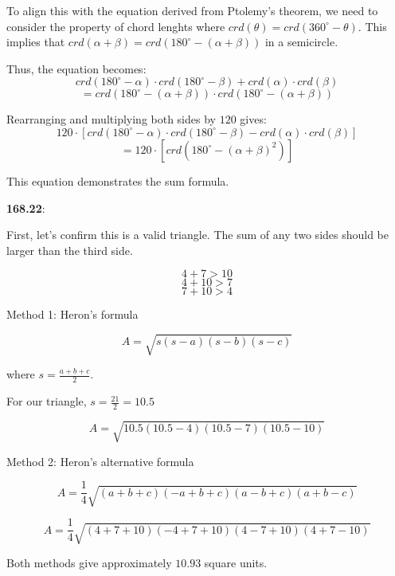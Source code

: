 \documentclass{article}
\begin{document}
To align this with the equation derived from Ptolemy's theorem, we need
to consider the property of chord lenghts where $crd(\theta) = crd(360^\circ - \theta)$.
This implies that $crd(\alpha + \beta) = crd(180^\circ - (\alpha + \beta))$ in a semicircle.

Thus, the equation becomes:
\[crd(180^\circ - \alpha) \cdot crd(180^\circ - \beta) + crd(\alpha) \cdot crd(\beta)\]
\[= crd(180^\circ - (\alpha + \beta)) \cdot crd(180^\circ - (\alpha + \beta))\]

Rearranging and multiplying both sides by $120$ gives:
\[120 \cdot [crd(180^\circ - \alpha) \cdot crd(180^\circ - \beta) - crd(\alpha) \cdot crd(\beta)]\]
\[= 120 \cdot [crd(180^\circ - (\alpha + \beta)^2)]\]

This equation demonstrates the sum formula.

\textbf{168.22}:

First, let's confirm this is a valid triangle.
The sum of any two sides should be larger than the third side.

\[4 + 7 > 10\]
\[4 + 10 > 7\]
\[7 + 10 > 4\]

Method 1: Heron's formula

\[A = \sqrt{s(s-a)(s-b)(s-c)}\]

where $s = \frac{a+b+c}{2}$.

For our triangle,
$s = \frac{21}{2} = 10.5$

\[A = \sqrt{10.5(10.5 - 4)(10.5 - 7)(10.5 - 10)}\]

Method 2: Heron's alternative formula

\[A = \frac{1}{4} \sqrt{(a+b+c)(-a + b + c)(a - b + c)(a + b - c)}\]

\[A = \frac{1}{4} \sqrt{(4+7+10)(-4+7+10)(4-7+10)(4+7-10)}\]

Both methods give approximately $10.93$ square units.
\end{document}
